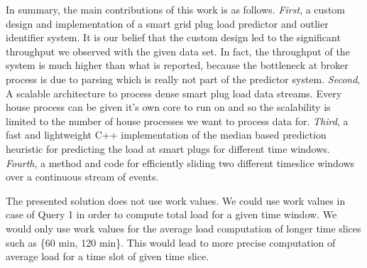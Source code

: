 In summary, the main contributions of this work is as follows. \textit{First}, a custom design and implementation of a smart grid plug load predictor and outlier identifier system. It is our belief that the custom design led to the significant throughput we observed with the given data set. In fact, the throughput of the system is much higher than what is reported, because the bottleneck at broker process is due to parsing which is really not part of the predictor system. \textit{Second}, A scalable architecture to process dense smart plug load data streams. Every house process can be given it's own core to run on and so the scalability is limited to the number of house processes we want to process data for. \textit{Third}, a fast and lightweight C++ implementation of the median based prediction heuristic for predicting the load at smart plugs for different time windows. \textit{Fourth}, a method and code for efficiently sliding two different timeslice windows over a continuous stream of events.

The presented solution does not use work values.
We could use work values in case of Query 1 in order to compute total load for a given time window.
We would only use work values for the average load computation of longer time slices such as \{60 min, 120 min\}. This would lead to more precise computation of average load for a time slot of given time slice.

